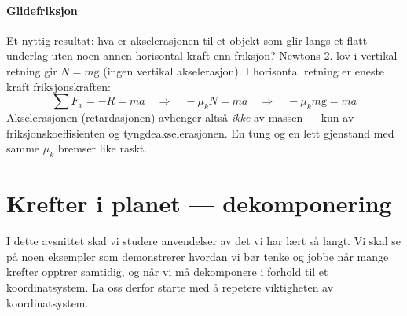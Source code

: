 
\paragraph*{Glidefriksjon}

Et nyttig resultat: hva er akselerasjonen til et objekt som glir langs et flatt underlag uten noen annen horisontal kraft enn friksjon? Newtons 2. lov i vertikal retning gir $N = m\mathrm{g}$ (ingen vertikal akselerasjon). I horisontal retning er eneste kraft friksjonskraften:
\[
    \sum F_x = -R = ma
    \quad\Rightarrow\quad
    -\mu_k N = ma
    \quad\Rightarrow\quad
    -\mu_k m\mathrm{g} = ma
\]
Akselerasjonen (retardasjonen) avhenger altså \textit{ikke} av massen — kun av friksjonskoeffisienten og tyngdeakselerasjonen. En tung og en lett gjenstand med samme $\mu_k$ bremser like raskt.





\section{Krefter i planet — dekomponering}
I dette avsnittet skal vi studere anvendelser av det vi har lært så langt. Vi skal se på noen eksempler som demonstrerer hvordan vi bør tenke og jobbe når mange krefter opptrer samtidig, og når vi må dekomponere i forhold til et koordinatsystem. La oss derfor starte med å repetere viktigheten av koordinatsystem.

